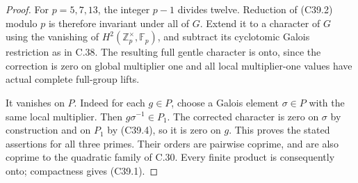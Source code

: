 \begin{proof}
For \(p=5,7,13\), the integer \(p-1\) divides twelve.
Reduction of (C39.2) modulo \(p\) is therefore invariant
under all of \(G\).
Extend it to a character of \(G\) using the vanishing
of \(H^2(\mathbb Z_p^\times,\mathbb F_p)\), and subtract
its cyclotomic Galois restriction as in C.38.
The resulting full gentle character is onto, since
the correction is zero on global multiplier one
and all local multiplier-one values have actual
complete full-group lifts.

It vanishes on \(P\).
Indeed for each \(g\in P\), choose a Galois element
\(\sigma\in P\) with the same local multiplier.
Then \(g\sigma^{-1}\in P_1\).
The corrected character is zero on \(\sigma\)
by construction and on \(P_1\) by (C39.4), so it
is zero on \(g\).
This proves the stated assertions for all three primes.
Their orders are pairwise coprime, and are also coprime
to the quadratic family of C.30.
Every finite product is consequently onto; compactness
gives (C39.1).
\end{proof}
